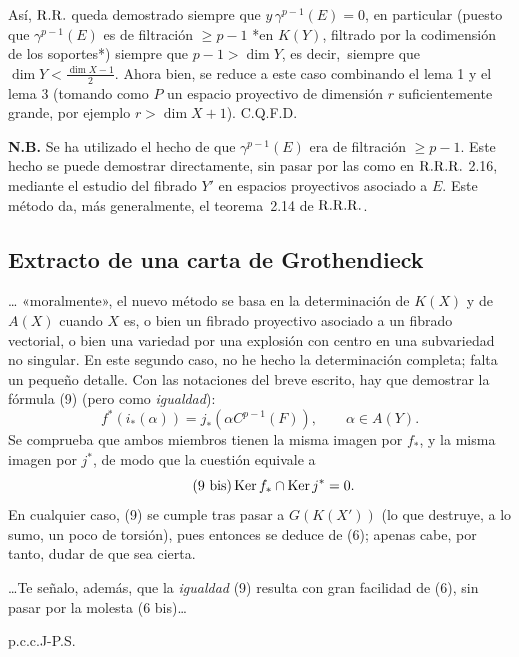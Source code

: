 Así, \(\mathrm{R.R.}\) queda demostrado siempre que \(y\,\gamma^{p-1}(E)=0\), en particular (puesto que \(\gamma^{p-1}(E)\) es de filtración \(\geq p-1\) {*}en \(K(Y)\), filtrado por la codimensión de los soportes{*}) siempre que \(p-1>\dim Y\), es decir,\ siempre que \(\dim Y<\frac{\dim X-1}{2}\). Ahora bien, se reduce a este caso combinando el lema 1 y el lema 3 (tomando como \(P\) un espacio proyectivo de dimensión \(r\) suficientemente grande, por ejemplo \(r>\dim X+1\)). C.Q.F.D.

\textbf{N.B.} Se ha utilizado el hecho de que \(\gamma^{p-1}(E)\) era de filtración \(\geq p-1\). Este hecho se puede demostrar directamente, sin pasar por las  como en \(\mathrm{R.R.R.}\) 2.16, mediante el estudio del fibrado \(Y'\) en espacios proyectivos asociado a \(E\). Este método da, más generalmente, el teorema\ 2.14 de \(\mathrm{R.R.R.}\).

\subsection*{Extracto de una carta de Grothendieck}
\dots{} «moralmente», el nuevo método se basa en la determinación de \(K(X)\) y de \(A(X)\) cuando \(X\) es, o bien un fibrado proyectivo asociado a un fibrado vectorial, o bien una variedad  por una explosión con centro en una subvariedad no singular. En este segundo caso, no he hecho la determinación completa; falta un pequeño detalle. Con las notaciones del breve escrito, hay que demostrar la fórmula (9) (pero como \emph{igualdad}):
\begin{equation}\tag{9}
  f^*(i_*(\alpha))=j_*(\alpha C^{p-1}(F)),\qquad \alpha\in A(Y).
\end{equation}
Se comprueba que ambos miembros tienen la misma imagen por \(f_*\), y la misma imagen por \(j^*\), de modo que la cuestión equivale a
\begin{equation}\tag{9 bis}
  \operatorname{Ker} f_*\cap\operatorname{Ker} j^*=0.
\end{equation}
En cualquier caso, (9) se cumple tras pasar a \(G(K(X'))\) (lo que destruye, a lo sumo, un poco de torsión), pues entonces se deduce de (6); apenas cabe, por tanto, dudar de que sea cierta.

\dots Te señalo, además, que la \emph{igualdad} (9) resulta con gran facilidad de (6), sin pasar por la molesta (6 bis)\dots

\begin{flushleft}
p.c.c.J-P.S.
\end{flushleft}

\newpage
